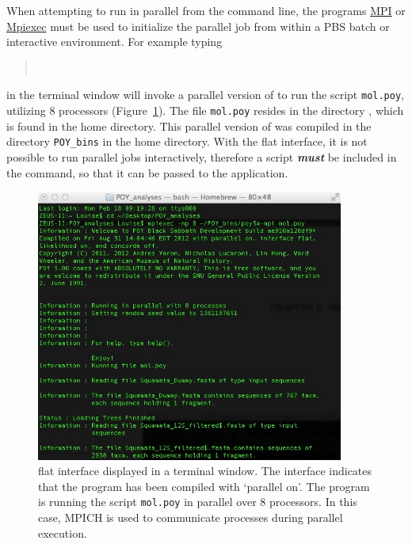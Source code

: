 When attempting to run \poy in parallel from the command line, the programs \href{http://www-unix.mcs.anl.gov/mpi/}{MPI} 
or \href {https://www.osc.edu/~djohnson/mpiexec/} {Mpiexec} must be used to initialize the parallel job 
from within a PBS batch or interactive environment.  For example typing

\begin{quote}
\\
\end{quote}
in the terminal window will invoke a parallel version of \poy to run the script \texttt{mol.poy}, utilizing 8 processors 
(Figure~\ref{fig:mpiexecscript}).  The file \texttt{mol.poy} resides in the directory , 
which is found in the home directory.
This parallel version of \poy was compiled in the directory 
\texttt{POY\_bins} in the home directory.  With the flat interface, it is not possible to run parallel jobs
interactively, therefore a script \textbf {\emph{must}} be included in the command, so that it can 
be passed to the application.  

\begin{figure}
\begin{center}
\includegraphics[width=0.9\textwidth]{doc/figures/mpiexec_script.jpg}
\end{center}
\caption{\poy flat interface displayed in a terminal window. The interface indicates that the program 
has been compiled with `parallel on'. The program is running the script \texttt{mol.poy} in parallel 
over 8 processors. In this case, MPICH is used to communicate processes during  parallel execution.}
\label{fig:mpiexecscript}
\end{figure}

